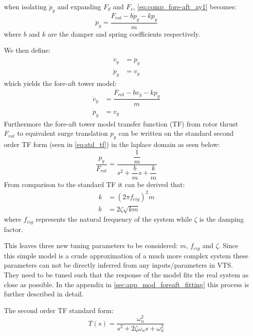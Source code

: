 when isolating $ \ddot{p}_y $ and expanding $ F_d $ and $ F_s $, \cref{eq:comp_fore-aft_ay1} becomes:
\begin{equation}\label{eq:comp_fore-aft_ay2}
	\ddot{p}_y = \dfrac{F_{rot} - b \dot{p}_y - k p_y}{m}
\end{equation}
where $ b $ and $ k $ are the damper and spring coefficients respectively.

We then define:
\begin{align}
	\dot{v}_y & = \ddot{p}_y \label{eq:comp_fore-aft_ay} \\
	\dot{p}_y & = v_y \label{eq:comp_fore-aft_vy}
\end{align}
which yields the fore-aft tower model:
\begin{align}
	\dot{v}_y & = \dfrac{F_{rot} - b v_y - k p_y}{m}  \label{eq:comp_fore-aft_1} \\
	\dot{p}_y & = v_y \label{eq:comp_fore-aft_2}
\end{align}
Furthermore the fore-aft tower model transfer function (TF) from rotor thrust $ F_{rot} $ to equivalent surge translation $ p_y $ can be written on the standard second order TF form (seen in \cref{eq:std_tf}) in the laplace domain as seen below:
\begin{equation}\label{eq:comp_fore_aft_tf}
	\dfrac{p_y}{F_{rot}} = \dfrac{\dfrac{1}{m}}{s^2 + \dfrac{b}{m} s + \dfrac{k}{m}}
\end{equation}
From comparison to the standard TF it can be derived that:
\begin{align}
	k & = (2 \pi f_{eig})^2 m \label{eq:comp_fore_aft_tf_k} \\
	b & = 2 \zeta \sqrt{k m} \label{eq:comp_fore_aft_tf_b}
\end{align}
where $ f_{eig} $ represents the natural frequency of the system while $ \zeta $ is the damping factor. 

This leaves three new tuning parameters to be considered: $ m $, $ f_{eig} $ and $ \zeta $. Since this simple model is a crude approximation of a much more complex system these parameters can not be directly inferred from any inputs/parameters in VTS. They need to be tuned such that the response of the model fits the real system as close as possible. In the appendix in \cref{sec:app_mod_foreaft_fitting} this process is further described in detail.

\medskip
The second order TF standard form:
\begin{equation}\label{eq:std_tf}
	T(s) = \dfrac{\omega_n^2}{s^2 + 2 \zeta \omega_n s + \omega_n^2}
\end{equation}


